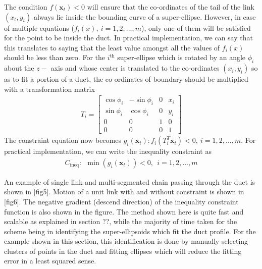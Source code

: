 \documentclass[12pt,a4]{article}
\begin{document}
The condition $f(\textbf{x}_t)<0$ will ensure that the co-ordinates of the tail of the link $(x_t,y_t)$ always lie inside the bounding curve of a super-ellipse. However, in case of multiple equations (${f_i(x)},~ i=1,2,...,m$), only one of them will be satisfied for the point to be inside the duct. In practical implementation, we can say that this translates to saying that the least value amongst all the values of ${f_i(x)}$ should be less than zero. For the $i^\text{th}$ super-ellipse which is rotated by an angle $\phi_i$ about the $z-$ axis and whose center is translated to the co-ordinates $(x_i,y_i)$ so as to fit a portion of a duct, the co-ordinates of boundary should be multiplied with a transformation matrix
\begin{align}
T_i = \begin{bmatrix}
\cos \phi_i & -\sin\phi_i & 0 & x_i\\
\sin \phi_i & \cos\phi_i & 0 & y_i\\
0 & 0 & 1 &0\\
0 & 0 & 0 & 1
\end{bmatrix}
\end{align}
The constraint equation now becomes $g_i(\textbf{x}_t) : f_i(T_i^T\textbf{x}_t)< 0,~ i=1,2,...,m$. For practical implementation, we can write the inequality constraint as 
\begin{align}
\label{eq: min_and_mingx}
C_{\text{ineq}}:~~ \min\left(g_i(\textbf{x}_t)\right) < 0,~~ i=1,2,...,m 
\end{align}

An example of single link and multi-segmented chain passing through the duct is shown in [fig5]. Motion of a unit link with and without constraint is shown in [fig6]. The negative gradient (descend direction) of the inequality constraint function is also shown in the figure. The method shown here is quite fast and scalable as explained in section ??, while the majority of time taken for the scheme being in identifying the super-ellipsoids which fit the duct profile. For the example shown in this section, this identification is done by manually selecting clusters of points in the duct and fitting ellipses which will reduce the fitting error in a least squared sense.
\end{document}
